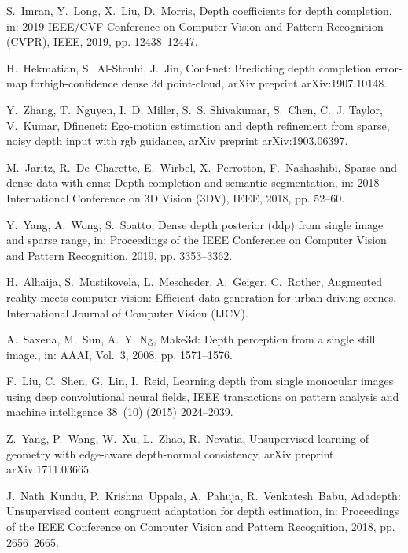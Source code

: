 \documentclass[5p]{elsarticle}
\begin{document}
\begin{thebibliography}{100}
S.~Imran, Y.~Long, X.~Liu, D.~Morris, Depth coefficients for depth completion,
  in: 2019 IEEE/CVF Conference on Computer Vision and Pattern Recognition
  (CVPR), IEEE, 2019, pp. 12438--12447.

H.~Hekmatian, S.~Al-Stouhi, J.~Jin, Conf-net: Predicting depth completion
  error-map forhigh-confidence dense 3d point-cloud, arXiv preprint
  arXiv:1907.10148.

Y.~Zhang, T.~Nguyen, I.~D. Miller, S.~S. Shivakumar, S.~Chen, C.~J. Taylor,
  V.~Kumar, Dfinenet: Ego-motion estimation and depth refinement from sparse,
  noisy depth input with rgb guidance, arXiv preprint arXiv:1903.06397.

M.~Jaritz, R.~De~Charette, E.~Wirbel, X.~Perrotton, F.~Nashashibi, Sparse and
  dense data with cnns: Depth completion and semantic segmentation, in: 2018
  International Conference on 3D Vision (3DV), IEEE, 2018, pp. 52--60.

Y.~Yang, A.~Wong, S.~Soatto, Dense depth posterior (ddp) from single image and
  sparse range, in: Proceedings of the IEEE Conference on Computer Vision and
  Pattern Recognition, 2019, pp. 3353--3362.

H.~Alhaija, S.~Mustikovela, L.~Mescheder, A.~Geiger, C.~Rother, Augmented
  reality meets computer vision: Efficient data generation for urban driving
  scenes, International Journal of Computer Vision (IJCV).

A.~Saxena, M.~Sun, A.~Y. Ng, Make3d: Depth perception from a single still
  image., in: AAAI, Vol.~3, 2008, pp. 1571--1576.

F.~Liu, C.~Shen, G.~Lin, I.~Reid, Learning depth from single monocular images
  using deep convolutional neural fields, IEEE transactions on pattern analysis
  and machine intelligence 38~(10) (2015) 2024--2039.

Z.~Yang, P.~Wang, W.~Xu, L.~Zhao, R.~Nevatia, Unsupervised learning of geometry
  with edge-aware depth-normal consistency, arXiv preprint arXiv:1711.03665.

J.~Nath~Kundu, P.~Krishna~Uppala, A.~Pahuja, R.~Venkatesh~Babu, Adadepth:
  Unsupervised content congruent adaptation for depth estimation, in:
  Proceedings of the IEEE Conference on Computer Vision and Pattern
  Recognition, 2018, pp. 2656--2665.


\end{thebibliography}
\end{document}
